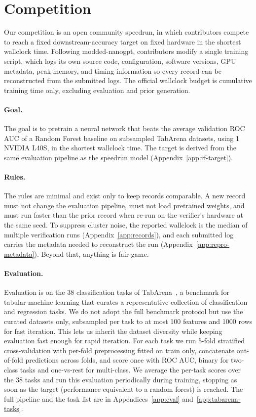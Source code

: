 \documentclass{article}
\theoremstyle{plain}
\theoremstyle{definition}
\theoremstyle{remark}
\begin{document}
\section{Competition}
Our competition is an open community speedrun, in which contributors compete to reach a fixed downstream-accuracy target on fixed hardware in the shortest wallclock time.
Following modded-nanogpt, contributors modify a single training script, which logs its own source code, configuration, software versions, GPU metadata, peak memory, and timing information so every record can be reconstructed from the submitted logs.
The official wallclock budget is cumulative training time only, excluding evaluation and prior generation.

\paragraph{Goal.}
The goal is to pretrain a neural network that beats the average validation ROC AUC of a Random Forest baseline on subsampled TabArena datasets, using 1 NVIDIA L40S, in the shortest wallclock time. The target is derived from the same evaluation pipeline as the speedrun model (Appendix~\ref{app:rf-target}).

\paragraph{Rules.}
The rules are minimal and exist only to keep records comparable.
A new record must not change the evaluation pipeline, must not load pretrained weights, and must run faster than the prior record when re-run on the verifier's hardware at the same seed.
To suppress cluster noise, the reported wallclock is the median of multiple verification runs (Appendix~\ref{app:records}), and each submitted log carries the metadata needed to reconstruct the run (Appendix~\ref{app:repro-metadata}).
Beyond that, anything is fair game.

\paragraph{Evaluation.}
Evaluation is on the 38 classification tasks of TabArena~\citep{erickson2025tabarena}, a benchmark for tabular machine learning that curates a representative collection of classification and regression tasks.
We do not adopt the full benchmark protocol but use the curated datasets only, subsampled per task to at most 100 features and 1000 rows for fast iteration.
This lets us inherit the dataset diversity while keeping evaluation fast enough for rapid iteration.
For each task we run 5-fold stratified cross-validation with per-fold preprocessing fitted on train only, concatenate out-of-fold predictions across folds, and score once with ROC AUC, binary for two-class tasks and one-vs-rest for multi-class.
We average the per-task scores over the 38 tasks and run this evaluation periodically during training, stopping as soon as the  target  (performance equivalent to a random forest) is reached. The full pipeline and the task list are in Appendices~\ref{app:eval} and~\ref{app:tabarena-tasks}.
\end{document}
